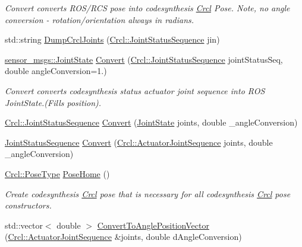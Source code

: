 \begin{DoxyCompactItemize}
\begin{DoxyCompactList}\small\item\em Convert converts R\-O\-S/\-R\-C\-S pose into codesynthesis \hyperlink{namespaceCrcl}{Crcl} Pose. Note, no angle conversion -\/ rotation/orientation always in radians. \end{DoxyCompactList}\item 
std\-::string \hyperlink{namespaceCrcl_ac02e068ed5b8f6f152cff928e554a653}{Dump\-Crcl\-Joints} (\hyperlink{namespaceCrcl_a8e2d423195eeffb85b45b63f595f2825}{Crcl\-::\-Joint\-Status\-Sequence} jin)
\item 
\hyperlink{RCS_8h_aa4adb93a26caa4dacba9c9614e283245}{sensor\-\_\-msgs\-::\-Joint\-State} \hyperlink{namespaceCrcl_a84440a94ca5992cf4a01e4215d1cb363}{Convert} (\hyperlink{namespaceCrcl_a8e2d423195eeffb85b45b63f595f2825}{Crcl\-::\-Joint\-Status\-Sequence} joint\-Status\-Seq, double angle\-Conversion=1.)
\begin{DoxyCompactList}\small\item\em Convert converts codesynthesis status actuator joint sequence into R\-O\-S Joint\-State.(Fills position). \end{DoxyCompactList}\item 
\hyperlink{namespaceCrcl_a8e2d423195eeffb85b45b63f595f2825}{Crcl\-::\-Joint\-Status\-Sequence} \hyperlink{namespaceCrcl_a2a88d5186b3c539f968de637937294fb}{Convert} (\hyperlink{RCS_8h_aa4adb93a26caa4dacba9c9614e283245}{Joint\-State} joints, double \-\_\-angle\-Conversion)
\item 
\hyperlink{namespaceCrcl_a8e2d423195eeffb85b45b63f595f2825}{Joint\-Status\-Sequence} \hyperlink{namespaceCrcl_aa0e865c06943bf013c06bdc6fa538760}{Convert} (\hyperlink{namespaceCrcl_af084766e8e2d38a135cc67ef54d9904d}{Crcl\-::\-Actuator\-Joint\-Sequence} joints, double \-\_\-angle\-Conversion)
\item 
\hyperlink{namespaceCrcl_acc6c82b52280f4d0e74b82a92400956e}{Crcl\-::\-Pose\-Type} \hyperlink{namespaceCrcl_a5e9036e140bcf2156b7995085f36d75f}{Pose\-Home} ()
\begin{DoxyCompactList}\small\item\em Create codesynthesis \hyperlink{namespaceCrcl}{Crcl} pose that is necessary for all codesynthesis \hyperlink{namespaceCrcl}{Crcl} pose constructors. \end{DoxyCompactList}\item 
std\-::vector$<$ double $>$ \hyperlink{namespaceCrcl_a942871711b02866236621b132bf934c2}{Convert\-To\-Angle\-Position\-Vector} (\hyperlink{namespaceCrcl_af084766e8e2d38a135cc67ef54d9904d}{Crcl\-::\-Actuator\-Joint\-Sequence} \&joints, double d\-Angle\-Conversion)

\end{DoxyCompactItemize}
